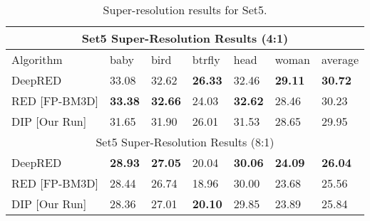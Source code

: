 \documentclass[12pt]{article}
\begin{document}
\begin{table}[htbp]
\centering
 \footnotesize\addtolength{\tabcolsep}{-5pt}
\begin{tabularx}{\linewidth}{|l||X X X X X||X|}
\hline
 \multicolumn{7}{|c|}{\textsf{Set5} Super-Resolution Results (4:1)} \\
 \hline
 Algorithm & \textsf{baby} & \textsf{bird} & \textsf{btrfly} & \textsf{head} & \textsf{woman} & average \\ [0.5ex] 
 \hline
DeepRED & 33.08 & 32.62 & \textbf{26.33} & 32.46 & \textbf{29.11} & \textbf{30.72} \\
RED [FP-BM3D] & \textbf{33.38} & \textbf{32.66} & 24.03 & \textbf{32.62} & 28.46 & 30.23 \\
DIP [Our Run] & 31.65 & 31.90 & 26.01 & 31.53 & 28.65 & 29.95 \\
 \hline\hline
\multicolumn{7}{|c|}{\textsf{Set5} Super-Resolution Results (8:1)} \\
 \hline 
DeepRED & \textbf{28.93} & \textbf{27.05} & 20.04 & \textbf{30.06} & \textbf{24.09} & \textbf{26.04} \\
 RED [FP-BM3D] & 28.44 & 26.74 & 18.96 & 30.00 & 23.68 & 25.56 \\
DIP [Our Run] & 28.36 & 27.01 & \textbf{20.10} & 29.85 & 23.89 & 25.84 \\
 \hline
\end{tabularx}
\caption{Super-resolution results for \textsf{Set5}.}
\label{Tab:set5}
\end{table}
\end{document}
